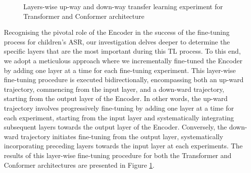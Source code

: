\begin{figure}
    \centering
    \caption{Layers-wise up-way and down-way transfer learning experiment for Transformer and Conformer architecture}
    \label{fig:layerWISE}
\end{figure}

Recognising the pivotal role of the Encoder in the success of the fine-tuning process for children's ASR, our investigation delves deeper to determine the specific layers that are the most important during this TL process. To this end, we adopt a meticulous approach where we incrementally fine-tuned the Encoder by adding one layer at a time for each fine-tuning experiment. This layer-wise fine-tuning procedure is executed bidirectionally, encompassing both an up-ward trajectory, commencing from the input layer, and a down-ward trajectory, starting from the output layer of the Encoder. In other words, the up-ward trajectory involves progressively fine-tuning by adding one layer at a time for each experiment, starting from the input layer and systematically integrating subsequent layers towards the output layer of the Encoder. Conversely, the down-ward trajectory initiates fine-tuning from the output layer, systematically incorporating preceding layers towards the input layer at each experiments. The results of this layer-wise fine-tuning procedure for both the Transformer and Conformer architectures are presented in Figure \ref{fig:layerWISE}.

